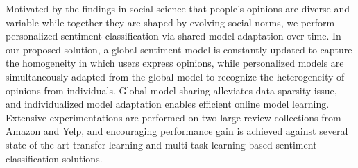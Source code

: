 Motivated by the findings in social science that people's opinions are diverse and variable while together they are shaped by evolving social norms, we perform personalized sentiment classification via shared model adaptation over time. In our proposed solution, a global sentiment model is constantly updated to capture the homogeneity in which users express opinions, while personalized models are simultaneously adapted from the global model to recognize the heterogeneity of opinions from individuals. Global model sharing alleviates data sparsity issue, and individualized model adaptation enables efficient online model learning. Extensive experimentations are performed on two large review collections from Amazon and Yelp, and encouraging performance gain is achieved against several state-of-the-art transfer learning and multi-task learning based sentiment classification solutions.
